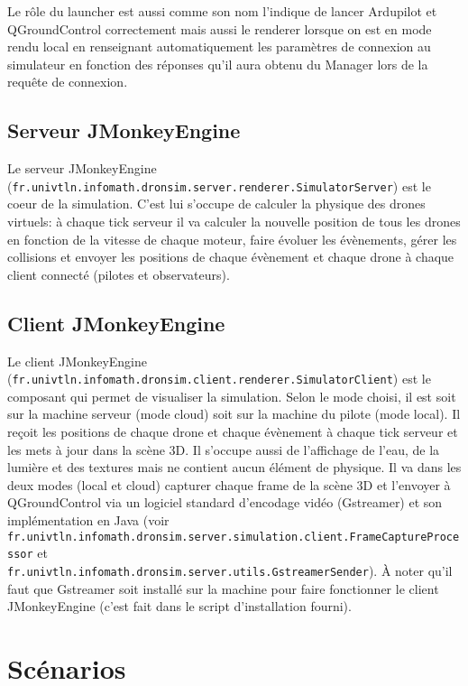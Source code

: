 \documentclass{scrartcl}
\begin{document}
Le rôle du launcher est aussi comme son nom l'indique de lancer Ardupilot et QGroundControl correctement mais aussi le renderer lorsque
on est en mode rendu local en renseignant automatiquement les paramètres de connexion au simulateur en fonction des réponses qu'il aura obtenu du Manager
lors de la requête de connexion.

\subsection{Serveur JMonkeyEngine}
Le serveur JMonkeyEngine (\texttt{fr.univtln.infomath.dronsim.server.renderer.SimulatorServer}) est le coeur de la simulation.
C'est lui s'occupe de calculer la physique des drones virtuels: à chaque tick serveur il va calculer la nouvelle position de tous les drones en fonction
de la vitesse de chaque moteur, faire évoluer les évènements, gérer les collisions et envoyer les positions de chaque évènement et chaque drone à chaque client connecté
(pilotes et observateurs).


\subsection{Client JMonkeyEngine}
Le client JMonkeyEngine (\texttt{fr.univtln.infomath.dronsim.client.renderer.SimulatorClient}) est le composant qui permet de visualiser la simulation. Selon le mode choisi,
il est soit sur la machine serveur (mode cloud) soit sur la machine du pilote (mode local). Il reçoit les positions de chaque drone et chaque évènement à chaque tick serveur
et les mets à jour dans la scène 3D. Il s'occupe aussi de l'affichage de l'eau, de la lumière et des textures mais ne contient aucun élément de physique.
Il va dans les deux modes (local et cloud) capturer chaque frame de la scène 3D et l'envoyer à QGroundControl via un logiciel standard d'encodage vidéo
(Gstreamer) et son implémentation en Java (voir \texttt{fr.univtln.infomath.dronsim.server.simulation.client.FrameCaptureProcessor} et\\
\texttt{fr.univtln.infomath.dronsim.server.utils.GstreamerSender}). À noter qu'il faut que Gstreamer soit installé sur la machine pour
faire fonctionner le client JMonkeyEngine (c'est fait dans le script d'installation fourni).

\section{Scénarios}
\end{document}
